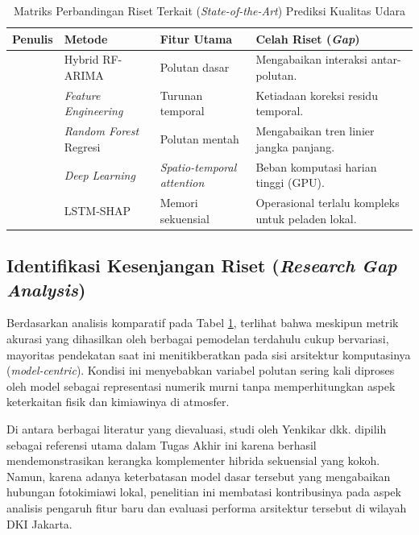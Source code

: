 \begin{table}[htbp]
\centering
\captionsetup{justification=centering}
\setlength{\tabcolsep}{5pt}
\caption{Matriks Perbandingan Riset Terkait (\textit{State-of-the-Art}) Prediksi Kualitas Udara}
\label{tbl:matriks_sota}

\begin{tabularx}{\textwidth}{|>{\raggedright\arraybackslash}p{3.2cm}|
                             >{\raggedright\arraybackslash}p{2.2cm}|
                             >{\raggedright\arraybackslash}X|
                             >{\raggedright\arraybackslash}X|}
\hline
\textbf{Penulis} & \textbf{Metode} & \textbf{Fitur Utama} & \textbf{Celah Riset (\textit{Gap})} \\
\hline
\textcite{yenkikar2025explainable} & Hybrid RF-ARIMA & Polutan dasar & Mengabaikan interaksi antar-polutan. \\
\hline
\textcite{naz2024two} & \textit{Feature Engineering} & Turunan temporal & Ketiadaan koreksi residu temporal. \\
\hline
\textcite{alarsy2025pm25} & \textit{Random Forest} Regresi & Polutan mentah & Mengabaikan tren linier jangka panjang. \\
\hline
\textcite{chen2025hybrid} & \textit{Deep Learning} & \textit{Spatio-temporal attention} & Beban komputasi harian tinggi (GPU). \\
\hline
\textcite{radjabaycolle2025improving} & LSTM-SHAP & Memori sekuensial & Operasional terlalu kompleks untuk peladen lokal. \\
\hline
\end{tabularx}
\end{table}

\subsection{Identifikasi Kesenjangan Riset (\textit{Research Gap Analysis})}

Berdasarkan analisis komparatif pada Tabel \ref{tbl:matriks_sota}, terlihat bahwa meskipun metrik akurasi yang dihasilkan oleh berbagai pemodelan terdahulu cukup bervariasi, mayoritas pendekatan saat ini menitikberatkan pada sisi arsitektur komputasinya (\textit{model-centric}). Kondisi ini menyebabkan variabel polutan sering kali diproses oleh model sebagai representasi numerik murni tanpa memperhitungkan aspek keterkaitan fisik dan kimiawinya di atmosfer.

Di antara berbagai literatur yang dievaluasi, studi oleh Yenkikar dkk. \autocite{yenkikar2025explainable} dipilih sebagai referensi utama dalam Tugas Akhir ini karena berhasil mendemonstrasikan kerangka komplementer hibrida sekuensial yang kokoh. Namun, karena adanya keterbatasan model dasar tersebut yang mengabaikan hubungan fotokimiawi lokal, penelitian ini membatasi kontribusinya pada aspek analisis pengaruh fitur baru dan evaluasi performa arsitektur tersebut di wilayah DKI Jakarta. 


